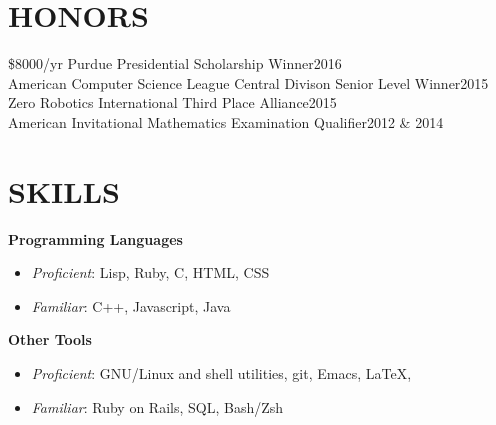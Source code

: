 \documentclass[line,margin]{res}
\begin{document}
\begin{resume}
  \section{HONORS}
  \$8000/yr Purdue Presidential Scholarship Winner\hfill 2016\\
  American Computer Science League Central Divison Senior Level Winner\hfill 2015\\
  Zero Robotics International Third Place Alliance\hfill 2015\\
  American Invitational Mathematics Examination Qualifier\hfill 2012 \& 2014\\


  \section{SKILLS}
  {\bf\rmfamily Programming Languages}
  \begin{itemize} \itemsep -2pt
  \item \emph{Proficient}: Lisp, Ruby, C, HTML, CSS
  \item \emph{Familiar}: C++, Javascript, Java
  \end{itemize}

  {\bf\rmfamily Other Tools}
  \begin{itemize} \itemsep -2pt
  \item \emph{Proficient}: GNU/Linux and shell utilities, git, Emacs, \LaTeX,
  \item \emph{Familiar}: Ruby on Rails, SQL, Bash/Zsh
  \end{itemize}






\end{resume}
\end{document}
